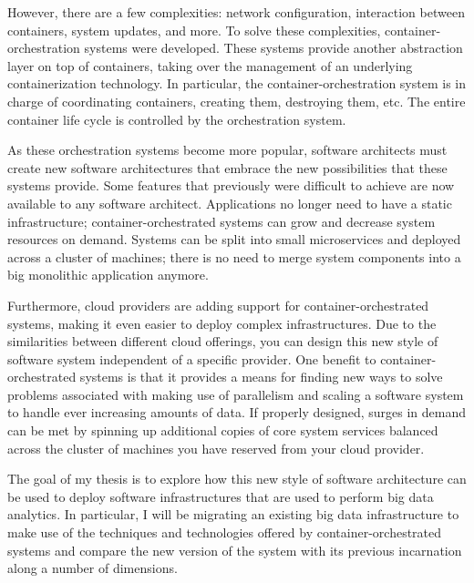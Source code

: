 However, there are a few complexities: network configuration, interaction between containers, system updates, and more. To solve these complexities, container-orchestration systems were developed. These systems provide another abstraction layer on top of containers,  taking over the management of an underlying containerization technology. In particular, the container-orchestration system is in charge of coordinating containers, creating them, destroying them, etc. The entire container life cycle is controlled by the orchestration system.

As these orchestration systems become more popular, software architects must create new software architectures that embrace the new possibilities that these systems provide. Some features that previously were difficult to achieve are now available to any software architect. Applications no longer need to have a static infrastructure; container-orchestrated systems can grow and decrease system resources on demand. Systems can be split into small microservices and deployed across a cluster of machines; there is no need to merge system components into a big monolithic application anymore.

Furthermore, cloud providers are adding support for container-orchestrated systems, making it even easier to deploy complex infrastructures. Due to the similarities between different cloud offerings, you can design this new style of software system independent of a specific provider. One benefit to container-orchestrated systems is that it provides a means for finding new ways to solve problems associated with making use of parallelism and scaling a software system to handle ever increasing amounts of data. If properly designed, surges in demand can be met by spinning up additional copies of core system services balanced across the cluster of machines you have reserved from your cloud provider.

The goal of my thesis is to explore how this new style of software architecture can be used to deploy software infrastructures that are used to perform big data analytics. In particular, I will be migrating an existing big data infrastructure to make use of the techniques and technologies offered by container-orchestrated systems and compare the new version of the system with its previous incarnation along a number of dimensions. 
